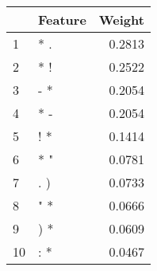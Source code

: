 \begin{tabular}{llr}
\toprule
{} & Feature &  Weight \\
\midrule
1  &     * . &  0.2813 \\
2  &     * ! &  0.2522 \\
3  &     - * &  0.2054 \\
4  &     * - &  0.2054 \\
5  &     ! * &  0.1414 \\
6  &     * " &  0.0781 \\
7  &     . ) &  0.0733 \\
8  &     " * &  0.0666 \\
9  &     ) * &  0.0609 \\
10 &     : * &  0.0467 \\
\bottomrule
\end{tabular}
